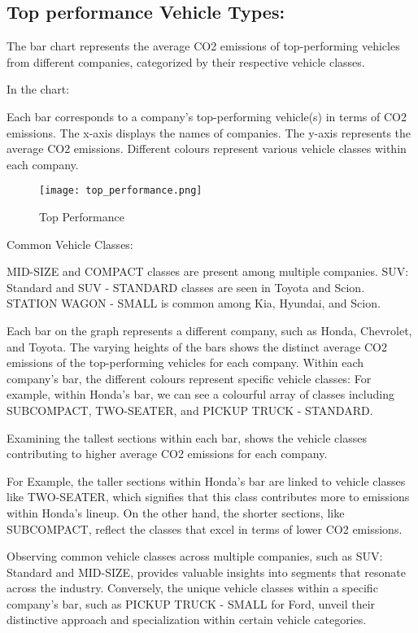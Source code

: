 \documentclass[12pt, a4paper,oneside]{book}
\numberwithin{equation}{section}
\begin{document}
\subsection{Top performance Vehicle Types:}

The bar chart represents the average CO2 emissions of top-performing vehicles from different companies, categorized by their respective vehicle classes.

In the chart:

Each bar corresponds to a company's top-performing vehicle(s) in terms of CO2 emissions.
The x-axis displays the names of companies.
The y-axis represents the average CO2 emissions.
Different colours represent various vehicle classes within each company.

 \begin{figure}[H]
\centerline{\texttt{[image: top\_performance.png]}}
\caption{Top Performance}
\label{fig:4.2}
\end{figure}


Common Vehicle Classes:

MID-SIZE and COMPACT classes are present among multiple companies.
SUV: Standard and SUV - STANDARD classes are seen in Toyota and Scion.
STATION WAGON - SMALL is common among Kia, Hyundai, and Scion.

Each bar on the graph represents a different company, such as Honda, Chevrolet, and Toyota. The varying heights of the bars shows the distinct average CO2 emissions of the top-performing vehicles for each company. Within each company's bar, the different colours represent specific vehicle classes:
For example, within Honda's bar, we can see a colourful array of classes including SUBCOMPACT, TWO-SEATER, and PICKUP TRUCK - STANDARD.

Examining the tallest sections within each bar, shows the vehicle classes contributing to higher average CO2 emissions for each company.

For Example, the taller sections within Honda's bar are linked to vehicle classes like TWO-SEATER, which signifies that this class contributes more to emissions within Honda's lineup.
On the other hand, the shorter sections, like SUBCOMPACT, reflect the classes that excel in terms of lower CO2 emissions.

Observing common vehicle classes across multiple companies, such as SUV: Standard and MID-SIZE, provides valuable insights into segments that resonate across the industry.
Conversely, the unique vehicle classes within a specific company's bar, such as PICKUP TRUCK - SMALL for Ford, unveil their distinctive approach and specialization within certain vehicle categories.
\end{document}
